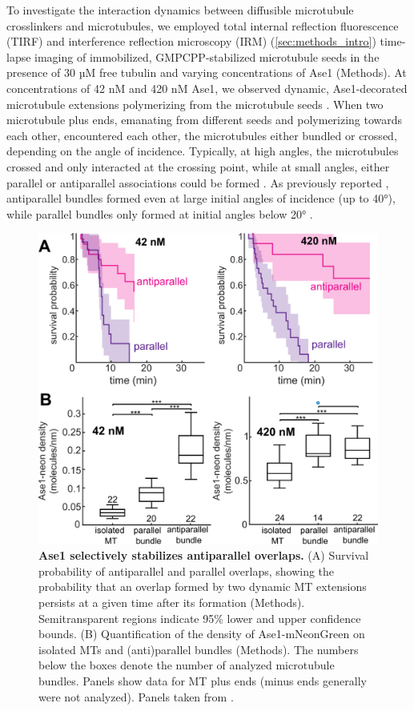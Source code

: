 To investigate the interaction dynamics between diffusible microtubule crosslinkers and microtubules, we employed total internal reflection fluorescence (TIRF) and interference reflection microscopy (IRM) (\autoref{sec:methods_intro}) time-lapse imaging of immobilized, GMPCPP-stabilized microtubule seeds in the presence of 30 µM free tubulin and varying concentrations of Ase1 (Methods). At concentrations of 42 nM and 420 nM Ase1, we observed dynamic, Ase1-decorated microtubule extensions polymerizing from the microtubule seeds . When two microtubule plus ends, emanating from different seeds and polymerizing towards each other, encountered each other, the microtubules either bundled or crossed, depending on the angle of incidence. Typically, at high angles, the microtubules crossed and only interacted at the crossing point, while at small angles, either parallel or antiparallel associations could be formed . As previously reported \parencite{Janson2007}, antiparallel bundles formed even at large initial angles of incidence (up to 40°), while parallel bundles only formed at initial angles below 20° .\par
\begin{figure}
    \centering
    \includegraphics[width=1\linewidth]{Figures/ase1_1b.png}
    \caption[Ase1 selectively stabilizes antiparallel overlaps.]{
    \textbf{Ase1 selectively stabilizes antiparallel overlaps.} (A) Survival probability of antiparallel and parallel overlaps, showing the probability that an overlap formed by two dynamic MT extensions persists at a given time after its formation (Methods). Semitransparent regions indicate 95\% lower and upper confidence bounds. (B) Quantification of the density of Ase1-mNeonGreen on isolated MTs and (anti)parallel bundles (Methods). The numbers below the boxes denote the number of analyzed microtubule bundles. Panels show data for MT plus ends (minus ends generally were not analyzed). Panels taken from \cite{Krattenmacher2024}.
        }\label{ase1b}
\end{figure}
